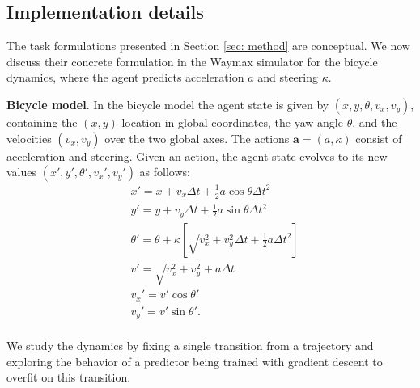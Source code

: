 

\begin{appendices}

\section{Implementation details}
The task formulations presented in Section \ref{sec: method} are conceptual. We now discuss their concrete formulation in the Waymax simulator \cite{gulino2024waymax} for the bicycle dynamics, where the agent predicts acceleration $a$ and steering $\kappa$.

\textbf{Bicycle model}. In the bicycle model the agent state is given by $(x, y, \theta, v_x, v_y)$, containing the $(x, y)$ location in global coordinates, the yaw angle $\theta$, and the velocities $(v_x, v_y)$ over the two global axes. The actions $\mathbf{a} = (a, \kappa)$ consist of acceleration and steering. Given an action, the agent state evolves to its new values $(x', y', \theta', v_x', v_y')$ as follows:
\begin{equation}
    \begin{aligned}
    & x' = x + v_x\Delta t + \frac{1}{2} a \cos \theta \Delta t^2 \\
    & y' = y + v_y\Delta t + \frac{1}{2} a \sin \theta \Delta t^2 \\
    & \theta' = \theta + \kappa \left[ \sqrt{v_x^2 + v_y^2} \Delta t + \frac{1}{2} a \Delta t^2\right] \\
    & v' = \sqrt{v_x^2 + v_y^2} + a \Delta t \\
    & v_x' = v' \cos \theta' \\
    & v_y' = v' \sin \theta'.\\
    \end{aligned}
\end{equation}

We study the dynamics by fixing a single transition from a trajectory and exploring the behavior of a predictor being trained with gradient descent to overfit on this transition. 


\end{appendices}
